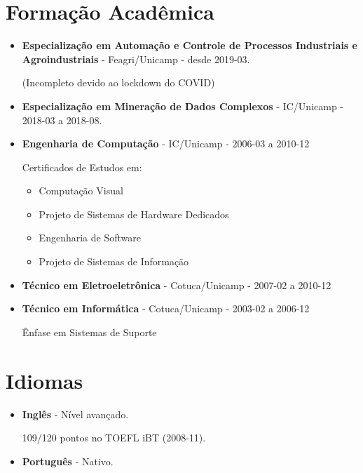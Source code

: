 \documentclass[a4paper,10pt]{article}
\begin{document}
  \section{Formação Acadêmica}
    \begin{itemize}
      \item
       \textbf{Especialização em Automação e Controle de Processos Industriais e Agroindustriais} - Feagri/Unicamp - desde 2019-03.

       (Incompleto devido ao lockdown do COVID)

      \item
        \textbf{Especialização em Mineração de Dados Complexos} - IC/Unicamp - 2018-03 a 2018-08.

      \item
        \textbf{Engenharia de Computação} - IC/Unicamp - 2006-03 a 2010-12


        Certificados de Estudos em:
        \begin{itemize}
          \item Computação Visual
          \item Projeto de Sistemas de Hardware Dedicados
          \item Engenharia de Software
          \item Projeto de Sistemas de Informação
        \end{itemize}



      \item  
        \textbf{Técnico em Eletroeletrônica} - Cotuca/Unicamp - 2007-02 a 2010-12


      \item  
        \textbf{Técnico em Informática} - Cotuca/Unicamp - 2003-02 a 2006-12

        Ênfase em Sistemas de Suporte


    \end{itemize}



  \section{Idiomas}
    \begin{itemize}
      \item  
        \textbf{Inglês} - Nível avançado.

        109/120 pontos no TOEFL iBT (2008-11).

      \item  
        \textbf{Português} - Nativo.
    \end{itemize}
\end{document}
